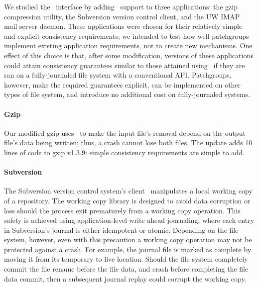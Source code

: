 We studied the \patchgroup\ interface by adding \patchgroup\ support to three
applications: the gzip compression utility, the Subversion version control
client, and the UW IMAP mail server daemon.
%
These applications were chosen for their relatively simple and explicit
consistency requirements; we intended to test how well patchgroups
implement existing application requirements, not to create new mechanisms.
One effect of this choice is that, after some modification, versions of
these applications could attain consistency guarantees similar to those
attained using \patchgroups\ if they are ran on a
fully-journaled file system with a conventional API.  Patchgroups, however,
make the required guarantees explicit, can be implemented on other types of
file system, and introduce no additional cost on fully-journaled systems.


\paragraph{Gzip}
\label{sec:patchgroup:gzip}

Our modified gzip uses \patchgroups\ to make the input file's
removal depend on the output file's data being written; thus,
a crash cannot lose both files. The update adds 10 lines of code to gzip
v1.3.9: simple consistency requirements are simple to add.

\paragraph{Subversion}
\label{sec:patchgroup:svn}


The Subversion version control system's client~\cite{svn} manipulates a
local working copy of a repository.
%
The working copy library is designed to avoid data corruption or loss
should the process exit prematurely from a working copy operation.
%
This safety is achieved using application-level write ahead journaling,
where each entry in Subversion's journal is either idempotent or
atomic.
%
Depending on the file system, however, even with this precaution a
working copy operation may not be protected against a crash.
%
For example, the journal file is marked as complete by moving it from
its temporary to live location.
%
Should the file system completely commit the file rename before
the file data, and crash before completing the file data commit, then
a subsequent journal replay could corrupt the working copy.

